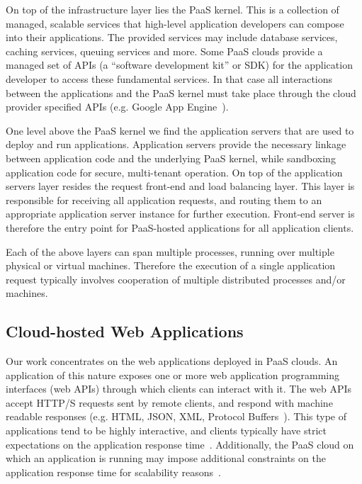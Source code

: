 On top of the infrastructure layer lies the PaaS kernel. This is a collection of managed, scalable
services that high-level application developers can compose into their applications. The provided services
may include database services, caching services, queuing services and more. Some PaaS clouds
provide a managed set of APIs (a ``software development
kit'' or SDK) for the application developer to access these fundamental services. 
In that case all interactions between the applications and the PaaS kernel must take place through
the cloud provider specified APIs (e.g. Google App Engine~\cite{gae}). 

One level above the PaaS kernel we find the application servers that are used to deploy and run
applications. Application servers provide the necessary linkage between application code and the
underlying PaaS kernel, while sandboxing application code for secure, multi-tenant operation. On top
of the application servers layer resides the request
front-end and load balancing layer. This layer is responsible
for receiving all application requests, and routing them to an appropriate application
server instance for further execution. Front-end server is therefore the entry point for PaaS-hosted
applications for all application clients.

Each of the above layers can span multiple processes, running over multiple physical or virtual
machines. Therefore the execution of a single application request typically involves cooperation
of multiple distributed processes and/or machines. 

\subsection{Cloud-hosted Web Applications} 


Our work concentrates on the web
applications deployed in PaaS clouds. An application of this nature exposes
one or more web application programming interfaces (web APIs) through which
clients can interact with it. The web APIs accept HTTP/S requests sent by
remote clients, and respond with machine readable responses (e.g. HTML, JSON,
XML, Protocol Buffers~\cite{protobuff}). This type of applications tend to be highly
interactive, and clients typically have strict expectations on the application
response time~\cite{latency-matters}.
Additionally, the PaaS cloud on
which an application is running may impose additional constraints on the
application response time for scalability
reasons~\cite{azure-limits,gae-limits}.  

